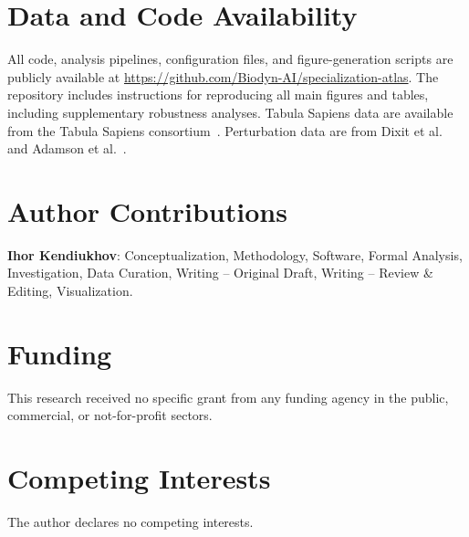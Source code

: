 \documentclass[11pt]{article}
\begin{document}
\section*{Data and Code Availability}

All code, analysis pipelines, configuration files, and figure-generation scripts are publicly available at \url{https://github.com/Biodyn-AI/specialization-atlas}. The repository includes instructions for reproducing all main figures and tables, including supplementary robustness analyses. Tabula Sapiens data are available from the Tabula Sapiens consortium~\cite{jones2022tabula}. Perturbation data are from Dixit et al.~\cite{dixit2016perturb} and Adamson et al.~\cite{adamson2016multiplexed}.

\section*{Author Contributions}

\textbf{Ihor Kendiukhov}: Conceptualization, Methodology, Software, Formal Analysis, Investigation, Data Curation, Writing -- Original Draft, Writing -- Review \& Editing, Visualization.

\section*{Funding}

This research received no specific grant from any funding agency in the public, commercial, or not-for-profit sectors.

\section*{Competing Interests}

The author declares no competing interests.

\end{document}
